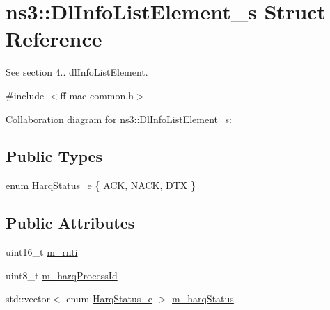 \hypertarget{structns3_1_1DlInfoListElement__s}{}\section{ns3\+:\+:Dl\+Info\+List\+Element\+\_\+s Struct Reference}
\label{structns3_1_1DlInfoListElement__s}


See section 4.. dl\+Info\+List\+Element.  




{\ttfamily \#include $<$ff-\/mac-\/common.\+h$>$}



Collaboration diagram for ns3\+:\+:Dl\+Info\+List\+Element\+\_\+s\+:
\subsection*{Public Types}
\begin{DoxyCompactItemize}
\item 
enum \hyperlink{structns3_1_1DlInfoListElement__s_a3e55b89f756b7bd8909c8116a202a17a}{Harq\+Status\+\_\+e} \{ \hyperlink{structns3_1_1DlInfoListElement__s_a3e55b89f756b7bd8909c8116a202a17aad38ddc6546e38c8a4ca738262e0401a2}{A\+CK}, 
\hyperlink{structns3_1_1DlInfoListElement__s_a3e55b89f756b7bd8909c8116a202a17aaf90e76e67c86729b4ee21927b7fb1770}{N\+A\+CK}, 
\hyperlink{structns3_1_1DlInfoListElement__s_a3e55b89f756b7bd8909c8116a202a17aa7ddd82eca16b2c3ae367936d486d7777}{D\+TX}
 \}
\end{DoxyCompactItemize}
\subsection*{Public Attributes}
\begin{DoxyCompactItemize}
\item 
uint16\+\_\+t \hyperlink{structns3_1_1DlInfoListElement__s_ae9e2e778e70c32b02fcab4b7a44829f3}{m\+\_\+rnti}
\item 
uint8\+\_\+t \hyperlink{structns3_1_1DlInfoListElement__s_a08c21d7853e7e1f3b89d6b70d7c496bb}{m\+\_\+harq\+Process\+Id}
\item 
std\+::vector$<$ enum \hyperlink{structns3_1_1DlInfoListElement__s_a3e55b89f756b7bd8909c8116a202a17a}{Harq\+Status\+\_\+e} $>$ \hyperlink{structns3_1_1DlInfoListElement__s_aceba0535e71de0c4b843bba4cbabd3ad}{m\+\_\+harq\+Status}
\end{DoxyCompactItemize}


